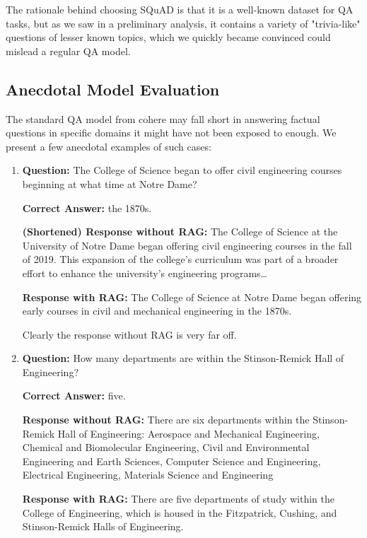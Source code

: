 \documentclass[12pt]{article}
\begin{document}
The rationale behind choosing SQuAD is that it is a well-known dataset for QA tasks, but as we saw in a preliminary analysis, it contains a variety of "trivia-like" questions of lesser known topics, which we quickly became convinced could mislead a regular QA model.

\subsection{Anecdotal Model Evaluation}

The standard QA model from cohere may fall short in answering factual questions in specific domains it might have not been exposed to enough. We present a few anecdotal examples of such cases:

\begin{enumerate}
    \item \textbf{Question:} The College of Science began to offer civil engineering courses beginning at what time at Notre Dame?
    
    \textbf{Correct Answer:} the 1870s.
    
    \textbf{(Shortened) Response without RAG:} The College of Science at the University of Notre Dame began offering civil engineering courses in the fall of 2019. This expansion of the college's curriculum was part of a broader effort to enhance the university's engineering programs\dots

    \textbf{Response with RAG:} The College of Science at Notre Dame began offering early courses in civil and mechanical engineering in the 1870s.
    
    Clearly the response without RAG is very far off.

    \item \textbf{Question:} How many departments are within the Stinson-Remick Hall of Engineering?
    
    \textbf{Correct Answer:} five.

    \textbf{Response without RAG:} There are six departments within the Stinson-Remick Hall of Engineering: 
    Aerospace and Mechanical Engineering,
    Chemical and Biomolecular Engineering,
    Civil and Environmental Engineering and Earth Sciences,
    Computer Science and Engineering,
    Electrical Engineering,
    Materials Science and Engineering 

    \textbf{Response with RAG:} There are five departments of study within the College of Engineering, which is housed in the Fitzpatrick, Cushing, and Stinson-Remick Halls of Engineering.


\end{enumerate}
\end{document}
